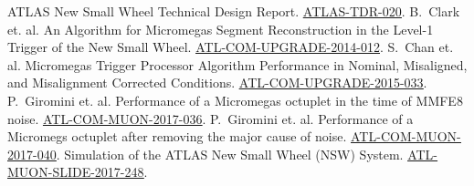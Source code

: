 \begin{thebibliography}{99}
\label{bibliography}
\setlength{\itemsep}{1.5pt plus 2.0pt minus 1.4pt}
\setlength{\parsep}{0pt}
\setlength{\parskip}{0pt}
\vspace{-6pt}

 ATLAS New Small Wheel Technical Design Report. \href{http://cds.cern.ch/record/1552862}{\color{blue}\underline{ATLAS-TDR-020}}.
 B.~Clark et. al. An Algorithm for Micromegas Segment Reconstruction in the Level-1 Trigger of the New Small Wheel. \href{https://cds.cern.ch/record/1706160}{\color{blue}\underline{ATL-COM-UPGRADE-2014-012}}.
 S.~Chan et. al. Micromegas Trigger Processor Algorithm Performance in Nominal, Misaligned, and Misalignment Corrected Conditions. \href{https://cds.cern.ch/record/2113121}{\color{blue}\underline{ATL-COM-UPGRADE-2015-033}}.
 P.~Giromini et. al. Performance of a Micromegas octuplet in the time of MMFE8 noise. \href{https://cds.cern.ch/record/2272355}{\color{blue}\underline{ATL-COM-MUON-2017-036}}.
 P.~Giromini et. al. Performance of a Micromegs octuplet after removing the major cause of noise. \href{https://cds.cern.ch/record/2277316}{\color{blue}\underline{ATL-COM-MUON-2017-040}}.
 Simulation of the ATLAS New Small Wheel (NSW) System. \href{http://cds.cern.ch/record/2265067}{\color{blue}\underline{ATL-MUON-SLIDE-2017-248}}.

\end{thebibliography}








